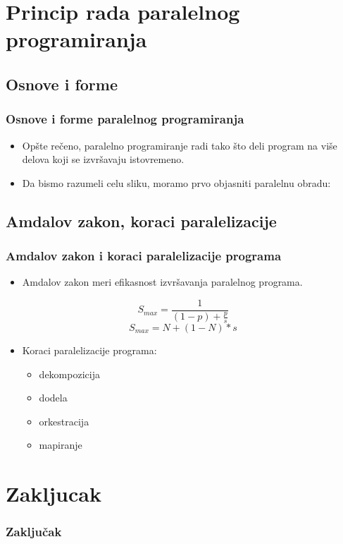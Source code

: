 \documentclass{beamer}
\begin{document}
	\section{Princip rada paralelnog programiranja}
	\subsection{Osnove i forme}
	\begin{frame}[fragile]\frametitle{Osnove i forme paralelnog programiranja}
		\begin{itemize}	
			\item Opšte rečeno, paralelno programiranje radi tako što deli program na više delova koji se izvršavaju istovremeno.			
			\item Da bismo razumeli celu sliku, moramo prvo objasniti paralelnu obradu:
		\end{itemize}
	\end{frame}

	\subsection{Amdalov zakon, koraci paralelizacije}
	\begin{frame}[fragile]\frametitle{Amdalov zakon i koraci paralelizacije programa}
	\begin{itemize}	
		\item Amdalov zakon meri efikasnost izvršavanja paralelnog programa.
	\end{itemize}
	\begin{multicols}{2}
		\begin{equation}
			S_{max} = \frac{1}{(1 - p) + \frac{p}{s}}
		\end{equation}\break
		\begin{equation}
			S_{max} = N + (1 - N) * s
		\end{equation}
	\end{multicols}
	\bigskip
	\begin{itemize}	
		\item Koraci paralelizacije programa:
		\begin{itemize}	
			\item dekompozicija
			\item dodela
			\item orkestracija
			\item mapiranje
		\end{itemize}
	\end{itemize}
	\end{frame}
	
	\section{Zakljucak}
	
	
	\begin{frame}[fragile]\frametitle{Zaključak}
	\end{frame}
	
\end{document}
